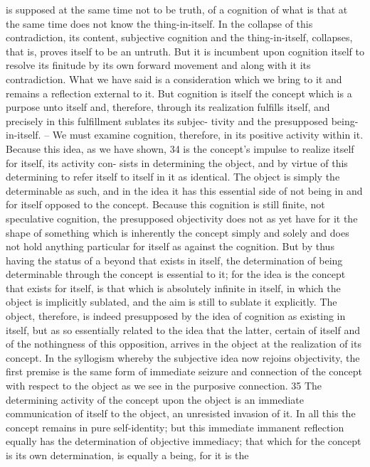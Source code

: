 is supposed at the same time not to be truth, of a cognition of what is
that at the same time does not know the thing-in-itself. In the collapse of
this contradiction, its content, subjective cognition and the thing-in-itself,
collapses, that is, proves itself to be an untruth. But it is incumbent upon
cognition itself to resolve its finitude by its own forward movement and
along with it its contradiction. What we have said is a consideration which
we bring to it and remains a reflection external to it. But cognition is
itself the concept which is a purpose unto itself and, therefore, through its
realization fulfills itself, and precisely in this fulfillment sublates its subjec-
tivity and the presupposed being-in-itself. – We must examine cognition,
therefore, in its positive activity within it. Because this idea, as we have
shown, 34 is the concept’s impulse to realize itself for itself, its activity con-
sists in determining the object, and by virtue of this determining to refer
itself to itself in it as identical. The object is simply the determinable as
such, and in the idea it has this essential side of not being in and for itself
opposed to the concept. Because this cognition is still finite, not speculative
cognition, the presupposed objectivity does not as yet have for it the shape
of something which is inherently the concept simply and solely and does
not hold anything particular for itself as against the cognition. But by thus
having the status of a beyond that exists in itself, the determination of being
determinable through the concept is essential to it; for the idea is the concept
that exists for itself, is that which is absolutely infinite in itself, in which the
object is implicitly sublated, and the aim is still to sublate it explicitly. The
object, therefore, is indeed presupposed by the idea of cognition as existing
in itself, but as so essentially related to the idea that the latter, certain of
itself and of the nothingness of this opposition, arrives in the object at the
realization of its concept.
In the syllogism whereby the subjective idea now rejoins objectivity, the
first premise is the same form of immediate seizure and connection of the
concept with respect to the object as we see in the purposive connection. 35
The determining activity of the concept upon the object is an immediate
communication of itself to the object, an unresisted invasion of it. In all this
the concept remains in pure self-identity; but this immediate immanent
reflection equally has the determination of objective immediacy; that which
for the concept is its own determination, is equally a being, for it is the
